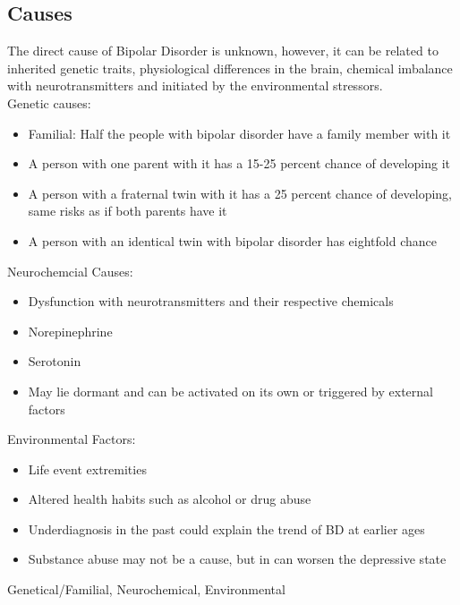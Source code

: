 \documentclass[journal]{IEEEtran}
\begin{document}
\subsection{Causes}
The direct cause of Bipolar Disorder is unknown, however, it can be related to inherited genetic traits, physiological differences in the brain, chemical imbalance with neurotransmitters and initiated by the environmental stressors.
\\
\vspace{2 mm}
Genetic causes:
\begin{itemize}
\item Familial: Half the people with bipolar disorder have a family member with it
\item A person with one parent with it has a 15-25 percent chance of developing it
\item A person with a fraternal twin with it has a 25 percent chance of developing, same risks as if both parents have it
\item A person with an identical twin with bipolar disorder has eightfold chance
\end{itemize}
\vspace{2 mm}
Neurochemcial Causes:
\begin{itemize}
\item Dysfunction with neurotransmitters and their respective chemicals
\item Norepinephrine
\item Serotonin
\item May lie dormant and can be activated on its own or triggered by external factors
\end{itemize}
Environmental Factors:
\begin{itemize}
\item Life event extremities
\item Altered health habits such as alcohol or drug abuse
\item Underdiagnosis in the past could explain the trend of BD at earlier ages
\item Substance abuse may not be a cause, but in can worsen the depressive state
\end{itemize}
\begin{IEEEkeywords}
Genetical/Familial, Neurochemical, Environmental
\end{IEEEkeywords}
\end{document}
